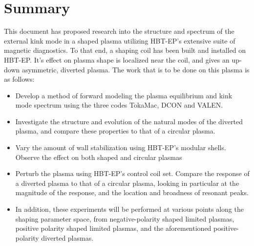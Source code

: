 \documentclass[aps,prl,twocolumn,superscriptaddress,groupedaddress]{revtex4}  %
\begin{document}
\newpage
\section{Summary}
This document has proposed research into the structure and spectrum of the external kink mode in a shaped plasma utilizing HBT-EP's extensive suite of magnetic diagnostics.  To that end, a shaping coil has been built and installed on HBT-EP.  It's effect on plasma shape is localized near the coil, and gives an up-down asymmetric, diverted plasma.  The work that is to be done on this plasma is as follows:
\begin{itemize}
\item Develop a method of forward modeling the plasma equilibrium and kink mode spectrum using the three codes TokaMac, DCON and VALEN.
\item Investigate the structure and evolution of the natural modes of the diverted plasma, and compare these properties to that of a circular plasma.
\item Vary the amount of wall stabilization using HBT-EP's modular shells.  Observe the effect on both shaped and circular plasmas
\item Perturb the plasma using HBT-EP's control coil set.  Compare the response of a diverted plasma to that of a circular plasma, looking in particular at the magnitude of the response, and the location and broadness of resonant peaks.
\item In addition, these experiments will be performed at various points along the shaping parameter space, from negative-polarity shaped limited plasmas, positive polarity shaped  limited plasmas, and the aforementioned positive-polarity diverted plasmas.
\end{itemize}
\end{document}
